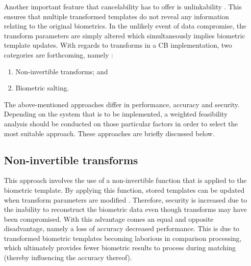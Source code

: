Another important feature that cancelability has to offer is unlinkability \citep{Rathgeb2011}. This ensures that multiple transformed templates do not reveal any information relating to the original biometrics. In the unlikely event of data compromise, the transform parameters are simply altered which simultaneously implies biometric template updates. 
With regards to transforms in a CB implementation, two categories are forthcoming, namely \citep{Jain2016}:
  

\begin{enumerate}[label=\roman*.]
	\item Non-invertible transforms; and
	\item Biometric salting.
\end{enumerate}

The above-mentioned approaches differ in performance, accuracy and security. Depending on the system that is to be implemented, a weighted feasibility analysis should be conducted on those particular factors in order to select the most suitable approach. These approaches are briefly discussed below.

	\subsection{Non-invertible transforms}
	This approach involves the use of a non-invertible function that is applied to the biometric template. By applying this function, stored templates can be updated when transform parameters are modified \citep{Piciucco2016,Rathgeb2011}. Therefore, security is increased due to the inability to reconstruct the biometric data even though transforms may have been compromised. With this advantage comes an equal and opposite disadvantage, namely a loss of accuracy decreased performance. This is due to transformed biometric templates becoming laborious in comparison processing, which ultimately provides fewer biometric results to process during matching (thereby influencing the accuracy thereof).
	

